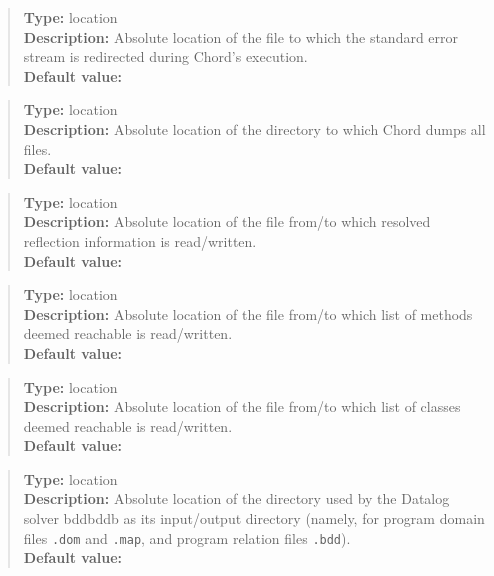 \noindent {}
\begin{quote}
{\bf Type:} location  \\
{\bf Description:} Absolute location of the file to which the standard error stream is redirected during Chord's execution. \\
{\bf Default value:} 
\end{quote}

\noindent {}
\begin{quote}
{\bf Type:} location \\
{\bf Description:} Absolute location of the directory to which Chord dumps all files. \\
{\bf Default value:} 
\end{quote}

\noindent {}
\begin{quote}
{\bf Type:} location  \\
{\bf Description:} Absolute location of the file from/to which resolved reflection information is read/written. \\
{\bf Default value:} 
\end{quote}

\noindent {}
\begin{quote}
{\bf Type:} location  \\
{\bf Description:} Absolute location of the file from/to which list of methods deemed reachable is read/written. \\
{\bf Default value:} 
\end{quote}

\noindent {}
\begin{quote}
{\bf Type:} location  \\
{\bf Description:} Absolute location of the file from/to which list of classes deemed reachable is read/written.  \\
{\bf Default value:} 
\end{quote}

\noindent {}
\begin{quote}
{\bf Type:} location \\
{\bf Description:} Absolute location of the directory used by the Datalog solver bddbddb as its input/output directory (namely, for program domain files {\tt *.dom} and {\tt *.map}, and program relation files {\tt *.bdd}). \\
{\bf Default value:} 
\end{quote}

